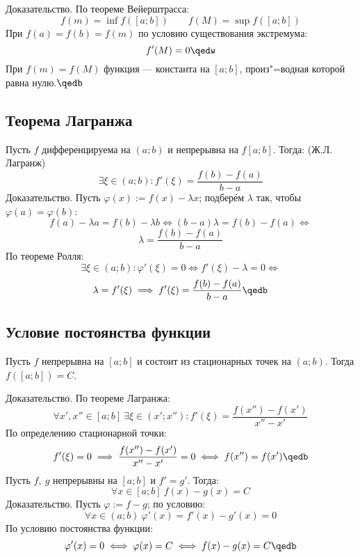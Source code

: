 {\bold Доказательство.} По теореме Вейерштрасса:
$$f(m)=\inf f([a;b])\quad\quad f(M)=\sup f([a;b])$$
При $f(a)=f(b)=f(m)$ по условию существования экстремума:
$$f'(M)=0\qedw$$
При $f(m)=f(M)$ функция --- константа на $[a;b]$, произ"=водная которой равна нулю.$\qedb$

\subsection{Теорема Лагранжа}

Пусть $f$ дифференцируема на $(a;b)$ и непрерывна на $f[a;b]$. Тогда: {\ital\color{desc}
(Ж.Л. Лагранж)}
$$\exists\xi\in(a;b)\colon f'(\xi)=\frac{f(b)-f(a)}{b-a}$$
{\bold Доказательство.} Пусть $\varphi(x):=f(x)-\lambda x$; подберём $\lambda$ так, чтобы 
$\varphi(a)=\varphi(b)$:
$$f(a)-\lambda a=f(b)-\lambda b\iff (b-a)\lambda=f(b)-f(a)\iff$$
$$\lambda=\frac{f(b)-f(a)}{b-a}$$
По теореме Ролля:
$$\exists\xi\in(a;b)\colon\varphi'(\xi)=0\iff f'(\xi)-\lambda=0\iff$$
$$\lambda=f'(\xi)\implies f'(\xi)=\frac{f(b)-f(a)}{b-a}\qedb$$

\subsection{Условие постоянства функции}

Пусть $f$ непрерывна на $[a;b]$ и состоит из стационарных точек на $(a;b)$. Тогда 
$f([a;b])=C$.

{\bold Доказательство.} По теореме Лагранжа:
$$\forall x',x''\in[a;b]\ \exists\xi\in(x';x'')\colon f'(\xi)=\frac{f(x'')-f(x')}{x''-x'}
$$
По определению стационарной точки:
$$f'(\xi)=0\implies \frac{f(x'')-f(x')}{x''-x'}=0\iff f(x'')=f(x')\qedb$$
Пусть $f,\ g$ непрерывны на $[a;b]$ и $f'=g'$. Тогда:
$$\forall x\in[a;b]\ f(x)-g(x)=C$$
{\bold Доказательство.} Пусть $\varphi:=f-g$; по условию:
$$\forall x\in(a;b)\ \varphi'(x)=f'(x)-g'(x)=0$$
По условию постоянства функции:
$$\varphi'(x)=0\iff\varphi(x)=C\iff f(x)-g(x)=C\qedb$$
